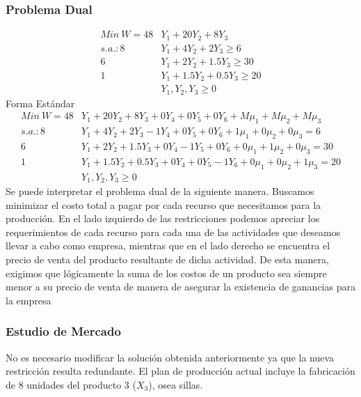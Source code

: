\begin{homeworkProblem}[1][Dakota]
\subsubsection{Problema Dual}
\begin{align*}
  Min\ W = 48&Y_1 + 20Y_2 + 8Y_3 \\
  s.a.: 8&Y_1 + 4Y_2 + 2Y_3 \ge 6 \\
        6&Y_1 + 2Y_2 + 1.5Y_3 \ge 30 \\
        1&Y_1 + 1.5Y_2 + 0.5Y_3 \ge 20 \\ 
        &Y_1,Y_2,Y_3 \ge 0
\end{align*}
Forma Estándar
\begin{align*}
  Min\ W = 48&Y_1 + 20Y_2 + 8Y_3 + 0Y_4 + 0Y_5 + 0Y_6 + M\mu_1 + M\mu_2 + M\mu_3 \\
  s.a.: 8&Y_1 + 4Y_2 + 2Y_3 - 1Y_4 + 0Y_5 + 0Y_6 + 1\mu_1 + 0\mu_2 + 0\mu_3 = 6\\
        6&Y_1 + 2Y_2 + 1.5Y_3 + 0Y_4 - 1Y_5 + 0Y_6 + 0\mu_1 + 1\mu_2 + 0\mu_3 = 30 \\
        1&Y_1 + 1.5Y_2 + 0.5Y_3 +0Y_4 + 0Y_5 - 1Y_6 + 0\mu_1 + 0\mu_2 + 1\mu_3 = 20   \\ 
        &Y_1,Y_2,Y_3 \ge 0
\end{align*}
Se puede interpretar el problema dual de la siguiente manera. Buscamos minimizar el costo total a pagar por cada recurso que necesitamos para la producción.
En el lado izquierdo de las restricciones podemos apreciar los requerimientos de cada recurso para cada una de las actividades que deseamos llevar a cabo como empresa, mientras
que en el lado derecho se encuentra el precio de venta del producto resultante de dicha actividad. De esta manera, exigimos que lógicamente la suma de los costos de un producto sea siempre menor a su precio de venta de manera de asegurar la existencia de ganancias para la empresa


\subsubsection{Estudio de Mercado}
No es necesario modificar la solución obtenida anteriormente ya que la nueva restricción resulta redundante.
El plan de producción actual incluye la fabricación de 8 unidades del producto 3 ($X_3$), osea sillas.


\end{homeworkProblem}
